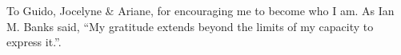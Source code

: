 \restoregeometry
\pagebreak

\hspace{0pt}
\vfill

\begin{dedication}
    To Guido, Jocelyne \& Ariane, for encouraging me to become who I am.
    As Ian M. Banks said, ``My gratitude extends beyond the limits of my capacity to express it.''.
\end{dedication}
\vfill

\clearpage
